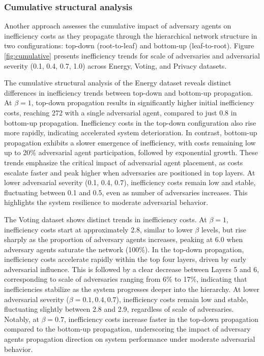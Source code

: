 \documentclass[journal]{IEEEtran}
\begin{document}
\subsubsection{Cumulative structural analysis}
Another approach assesses the cumulative impact of adversary agents on inefficiency costs as they propagate through the hierarchical network structure in two configurations: top-down (root-to-leaf) and bottom-up (leaf-to-root). Figure \ref{fig:cumulative} presents inefficiency trends for scale of adversaries and adversarial severity (0.1, 0.4, 0.7, 1.0) across Energy, Voting, and Privacy datasets.

The cumulative structural analysis of the Energy dataset reveals distinct differences in inefficiency trends between top-down and bottom-up propagation. At $\beta=1$,
top-down propagation results in significantly higher initial inefficiency costs, reaching 272 with a single adversarial agent, compared to just 0.8 in bottom-up propagation. Inefficiency costs in the top-down configuration also rise more rapidly, indicating accelerated system deterioration. In contrast, bottom-up propagation exhibits a slower emergence of inefficiency, with costs remaining low up to 20\% adversarial agent participation, followed by exponential growth. These trends emphasize the critical impact of adversarial agent placement, as costs escalate faster and peak higher when adversaries are positioned in top layers. At lower adversarial severity (0.1, 0.4, 0.7), inefficiency costs remain low and stable, fluctuating between 0.1 and 0.5, even as number of adversaries increases. This highlights the system resilience to moderate adversarial behavior.


The Voting dataset shows distinct trends in inefficiency costs. At $\beta = 1$, inefficiency costs start at approximately 2.8, similar to lower $\beta$ levels, but rise sharply as the proportion of adversary agents increases, peaking at 6.0 when adversary agents saturate the network (100\%). In the top-down propagation, inefficiency costs accelerate rapidly within the top four layers, driven by early adversarial influence. This is followed by a clear decrease between Layers 5 and 6, corresponding to scale of adversaries ranging from 6\% to 17\%, indicating that inefficiencies stabilize as the system progresses deeper into the hierarchy. At lower adversarial severity ($\beta = 0.1, 0.4, 0.7$), inefficiency costs remain low and stable, fluctuating slightly between 2.8 and 2.9, regardless of scale of adversaries. Notably, at $\beta = 0.7$, inefficiency costs increase faster in the top-down propagation compared to the bottom-up propagation, underscoring the impact of adversary agents propagation direction on system performance under moderate adversarial behavior.
\end{document}
